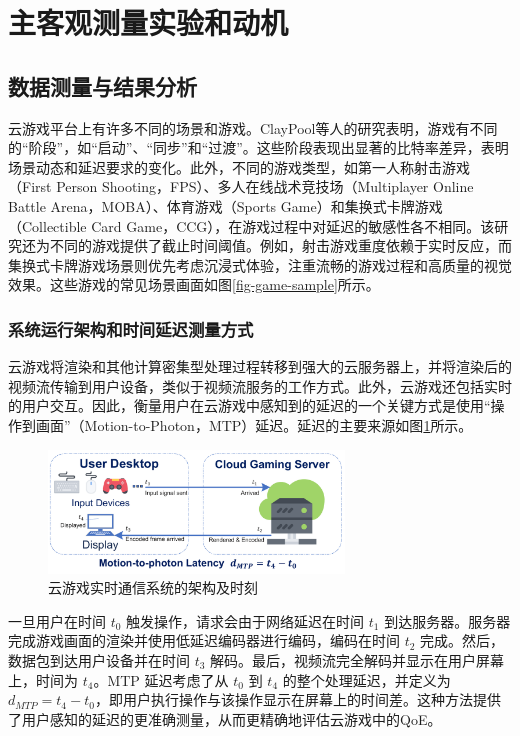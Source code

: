\section{主客观测量实验和动机}
\subsection{数据测量与结果分析}\label{sec-measurement-study}
云游戏平台上有许多不同的场景和游戏。ClayPool等人的研究\cite{claypool2010latency}表明，游戏有不同的“阶段”，如“启动”、“同步”和“过渡”。这些阶段表现出显著的比特率差异，表明场景动态和延迟要求的变化。此外，不同的游戏类型，如第一人称射击游戏（First Person Shooting，FPS）、多人在线战术竞技场（Multiplayer Online Battle Arena，MOBA）、体育游戏（Sports Game）和集换式卡牌游戏（Collectible Card Game，CCG），在游戏过程中对延迟的敏感性各不相同。该研究还为不同的游戏提供了截止时间阈值。例如，射击游戏重度依赖于实时反应，而集换式卡牌游戏场景则优先考虑沉浸式体验，注重流畅的游戏过程和高质量的视觉效果。这些游戏的常见场景画面如图\ref{fig-game-sample}所示。


\subsubsection{系统运行架构和时间延迟测量方式}
云游戏将渲染和其他计算密集型处理过程转移到强大的云服务器上，并将渲染后的视频流传输到用户设备，类似于视频流服务的工作方式。此外，云游戏还包括实时的用户交互。因此，衡量用户在云游戏中感知到的延迟的一个关键方式是使用“操作到画面”（Motion-to-Photon，MTP）延迟。延迟的主要来源如图\ref{fig_system_architecture}所示。

\begin{figure} [ht]
\centering
\includegraphics[width=0.7\textwidth]{figures/chap03/system_architecture.pdf} 
\caption{云游戏实时通信系统的架构及时刻}
\label{fig_system_architecture}
\end{figure}

一旦用户在时间 $t_0$ 触发操作，请求会由于网络延迟在时间 $t_1$ 到达服务器。服务器完成游戏画面的渲染并使用低延迟编码器进行编码，编码在时间 $t_2$ 完成。然后，数据包到达用户设备并在时间 $t_3$ 解码。最后，视频流完全解码并显示在用户屏幕上，时间为 $t_4$。MTP 延迟考虑了从 $t_0$ 到 $t_4$ 的整个处理延迟，并定义为 $d_{MTP} = t_4 - t_0$，即用户执行操作与该操作显示在屏幕上的时间差。这种方法提供了用户感知的延迟的更准确测量，从而更精确地评估云游戏中的QoE。

